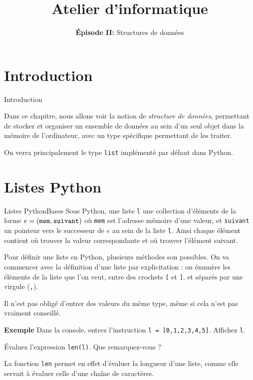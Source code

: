 \documentclass[10pt]{beamer}
\title{Atelier d'informatique}
\subtitle{\textbf{Épisode II:} Structures de données}
\begin{document}
\begin{frame}[fragile]
	\titlepage
\end{frame}

\section{Introduction}

\begin{frame}[fragile]{Introduction}
	
	Dans ce chapitre, nous allons voir la notion de \textit{structure de données}, permettant de stocker et organiser un ensemble de données au sein d'un seul objet dans la mémoire de l'ordinateur, avec un type spécifique permettant de les traiter.
	\pause
	
	On verra principalement le type \verb|list| implémenté par défaut dans Python.
\end{frame}

\section{Listes Python}

\begin{frame}[fragile]{Listes Python}{Bases}
	Sous Python, une liste \verb|l| une collection d'éléments de la forme $e = (\verb|mem|, \verb|suivant|)$ où \verb|mem| est l'adresse mémoire d'une valeur, et \verb|suivant| un pointeur vers le successeur de $e$ au sein de la liste \verb|l|. Ainsi chaque élément contient où trouver la valeur correspondante et où trouver l'élément suivant.
	\pause
	
	Pour définir une liste en Python, plusieurs méthodes son possibles. On va commencer avec la définition d'une liste par explicitation : on énumère les éléments de la liste que l'on veut, entre des crochets \verb|[| et \verb|]|, et séparés par une virgule (\verb|,|).
	\pause
	
	Il n'est pas obligé d'entrer des valeurs du même type, même si cela n'est pas vraiment conseillé.
	\pause
	
	\begin{block}{\textbf{Exemple}}
		Dans la console, entrez l'instruction \verb|l = [0,1,2,3,4,5]|. Affichez \verb|l|.
		\pause
		
		Évaluez l'expression \verb|len(l)|. Que remarquez-vous ?
	\end{block}
	
	La fonction \verb|len| permet en effet d'évaluer la longueur d'une liste, comme elle servait à évaluer celle d'une chaîne de caractères.
\end{frame}
\end{document}
